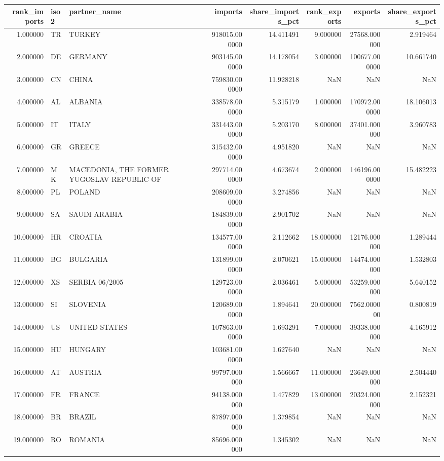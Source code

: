 \begin{tabular}{rllrrrrr}
\toprule
rank_imports & iso2 & partner_name & imports & share_imports_pct & rank_exports & exports & share_exports_pct \\
\midrule
1.000000 & TR & TURKEY & 918015.000000 & 14.411491 & 9.000000 & 27568.000000 & 2.919464 \\
2.000000 & DE & GERMANY & 903145.000000 & 14.178054 & 3.000000 & 100677.000000 & 10.661740 \\
3.000000 & CN & CHINA & 759830.000000 & 11.928218 & NaN & NaN & NaN \\
4.000000 & AL & ALBANIA & 338578.000000 & 5.315179 & 1.000000 & 170972.000000 & 18.106013 \\
5.000000 & IT & ITALY & 331443.000000 & 5.203170 & 8.000000 & 37401.000000 & 3.960783 \\
6.000000 & GR & GREECE & 315432.000000 & 4.951820 & NaN & NaN & NaN \\
7.000000 & MK & MACEDONIA, THE FORMER YUGOSLAV REPUBLIC OF & 297714.000000 & 4.673674 & 2.000000 & 146196.000000 & 15.482223 \\
8.000000 & PL & POLAND & 208609.000000 & 3.274856 & NaN & NaN & NaN \\
9.000000 & SA & SAUDI ARABIA & 184839.000000 & 2.901702 & NaN & NaN & NaN \\
10.000000 & HR & CROATIA & 134577.000000 & 2.112662 & 18.000000 & 12176.000000 & 1.289444 \\
11.000000 & BG & BULGARIA & 131899.000000 & 2.070621 & 15.000000 & 14474.000000 & 1.532803 \\
12.000000 & XS & SERBIA 06/2005 & 129723.000000 & 2.036461 & 5.000000 & 53259.000000 & 5.640152 \\
13.000000 & SI & SLOVENIA & 120689.000000 & 1.894641 & 20.000000 & 7562.000000 & 0.800819 \\
14.000000 & US & UNITED STATES & 107863.000000 & 1.693291 & 7.000000 & 39338.000000 & 4.165912 \\
15.000000 & HU & HUNGARY & 103681.000000 & 1.627640 & NaN & NaN & NaN \\
16.000000 & AT & AUSTRIA & 99797.000000 & 1.566667 & 11.000000 & 23649.000000 & 2.504440 \\
17.000000 & FR & FRANCE & 94138.000000 & 1.477829 & 13.000000 & 20324.000000 & 2.152321 \\
18.000000 & BR & BRAZIL & 87897.000000 & 1.379854 & NaN & NaN & NaN \\
19.000000 & RO & ROMANIA & 85696.000000 & 1.345302 & NaN & NaN & NaN \\

\end{tabular}
